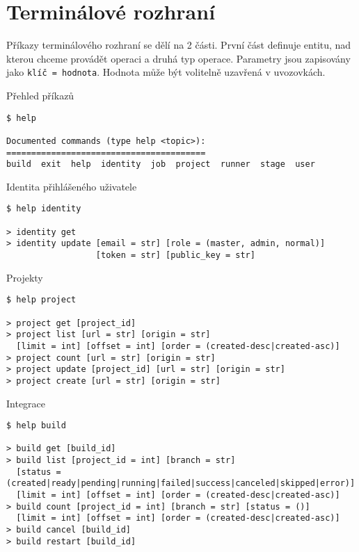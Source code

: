 \clearpage\section{Terminálové rozhraní}
{

Příkazy terminálového rozhraní se dělí na 2 části.
První část definuje entitu, nad kterou chceme provádět operaci a druhá typ operace.
Parametry jsou zapisovány jako \verb|klíč = hodnota|.
Hodnota může být volitelně uzavřená v uvozovkách.


\begin{listing}[H]
\caption{Přehled příkazů}
\begin{verbatim}
$ help

Documented commands (type help <topic>):
========================================
build  exit  help  identity  job  project  runner  stage  user
\end{verbatim}
\end{listing}

\begin{listing}[H]
\caption{Identita přihlášeného uživatele}
\begin{verbatim}
$ help identity

> identity get
> identity update [email = str] [role = (master, admin, normal)] 
                  [token = str] [public_key = str]
\end{verbatim}
\end{listing}

\begin{listing}[H]
\caption{Projekty}
\begin{verbatim}
$ help project

> project get [project_id]
> project list [url = str] [origin = str]
  [limit = int] [offset = int] [order = (created-desc|created-asc)]
> project count [url = str] [origin = str]
> project update [project_id] [url = str] [origin = str]
> project create [url = str] [origin = str]
\end{verbatim}
\end{listing}

\begin{listing}[H]
\caption{Integrace}
\begin{verbatim}
$ help build

> build get [build_id]
> build list [project_id = int] [branch = str]
  [status = (created|ready|pending|running|failed|success|canceled|skipped|error)]
  [limit = int] [offset = int] [order = (created-desc|created-asc)]
> build count [project_id = int] [branch = str] [status = ()]
  [limit = int] [offset = int] [order = (created-desc|created-asc)]
> build cancel [build_id]
> build restart [build_id]
\end{verbatim}
\end{listing}

}

